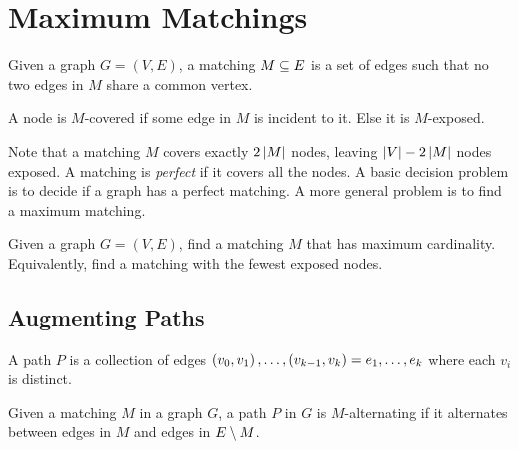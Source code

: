 \section{Maximum Matchings}
\label{sec:max_matchings}

\newcommand{\maxmatch}{\hyperref[prob:max_matching]{\color{black}\textsf{Maximum Matching}}}
\newcommand{\symdiff}{\ensuremath{\bigtriangleup}}


\begin{definition}[Matching]
    Given a graph $G = (V, E)$, a matching $M \subseteq E$ is a set of edges such that no two edges in $M$ share 
    a common vertex. 
    \label{def:matching}
    \begin{definition}
        A node is $M$-covered if some edge in $M$ is incident to it. Else it is $M$-exposed. 
    \end{definition}
\end{definition}

Note that a matching $M$ covers exactly $2\left\lvert M \right\rvert$ nodes, leaving $\left\lvert V \right\rvert - 2\left\lvert M \right\rvert$ nodes exposed. 
A matching is \emph{perfect} if it covers all the nodes. A basic decision problem is to decide if a graph has a perfect matching. 
A more general problem is to find a maximum matching. 

\begin{problem}
    Given a graph $G = (V, E)$, find a matching $M$ that has maximum cardinality. Equivalently, find a 
    matching with the fewest exposed nodes. 
    \label{prob:max_matching}
\end{problem}

\subsection{Augmenting Paths}

A path $P$ is a collection of edges $\left( v_0, v_1 \right), \ldots, \left( v_{k-1}, v_k \right) = e_1, \ldots, e_k $ where each $v_i$ is distinct.   

\begin{definition}
    Given a matching $M$ in a graph $G$, a path $P$ in $G$ is $M$-alternating if it alternates
    between edges in $M$ and edges in $E \setminus M$. 
    \label{def:alternate_path}
\end{definition}

